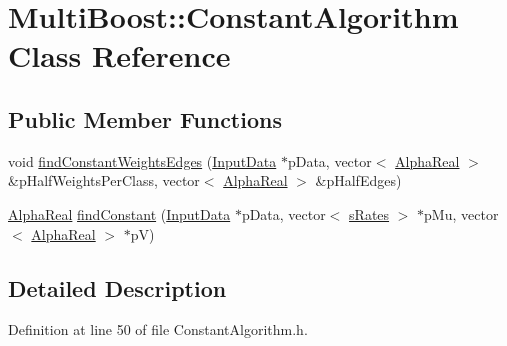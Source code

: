 \hypertarget{classMultiBoost_1_1ConstantAlgorithm}{\section{Multi\-Boost\-:\-:Constant\-Algorithm Class Reference}
\label{classMultiBoost_1_1ConstantAlgorithm}
}
\subsection*{Public Member Functions}
\begin{DoxyCompactItemize}
\item 
void \hyperlink{classMultiBoost_1_1ConstantAlgorithm_acbe922e5cc7b110581ee9de303d19710}{find\-Constant\-Weights\-Edges} (\hyperlink{classMultiBoost_1_1InputData}{Input\-Data} $\ast$p\-Data, vector$<$ \hyperlink{Defaults_8h_a80184c4fd10ab70a1a17c5f97dcd1563}{Alpha\-Real} $>$ \&p\-Half\-Weights\-Per\-Class, vector$<$ \hyperlink{Defaults_8h_a80184c4fd10ab70a1a17c5f97dcd1563}{Alpha\-Real} $>$ \&p\-Half\-Edges)
\item 
\hyperlink{Defaults_8h_a80184c4fd10ab70a1a17c5f97dcd1563}{Alpha\-Real} \hyperlink{classMultiBoost_1_1ConstantAlgorithm_acf2f17822f5825cfea555f12f9bdc4a9}{find\-Constant} (\hyperlink{classMultiBoost_1_1InputData}{Input\-Data} $\ast$p\-Data, vector$<$ \hyperlink{structMultiBoost_1_1sRates}{s\-Rates} $>$ $\ast$p\-Mu, vector$<$ \hyperlink{Defaults_8h_a80184c4fd10ab70a1a17c5f97dcd1563}{Alpha\-Real} $>$ $\ast$p\-V)
\end{DoxyCompactItemize}


\subsection{Detailed Description}


Definition at line 50 of file Constant\-Algorithm.\-h.



